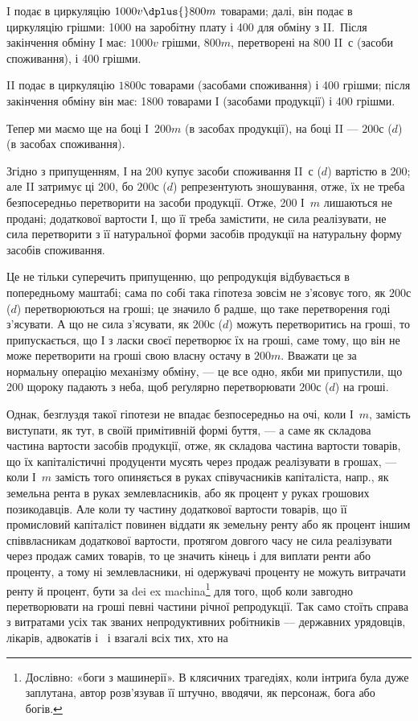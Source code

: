 
I подає в циркуляцію $1000 v \dplus{} 800 m$ товарами; далі, він подає
в циркуляцію грішми: 1000 на заробітну плату і 400
для обміну з II.~Після закінчення обміну І має: $1000 v$ грішми, $800 m$,
перетворені на 800 II~$с$ (засоби споживання), і 400 грішми.

II подає в циркуляцію $1800 с$ товарами (засобами споживання) і
400 грішми; після закінчення обміну він має: 1800 товарами І
(засобами продукції) і 400 грішми.

Тепер ми маємо ще на боці І~$200 m$ (в засобах продукції), на боці
II — $200 с$ ($d$) (в засобах споживання).

Згідно з припущенням, І на 200 купує засоби споживання
II~$с$ ($d$) вартістю в 200; але II затримує ці 200, бо $200 с$ ($d$)
репрезентують зношування, отже, їх не треба безпосередньо перетворити
на засоби продукції. Отже, 200 І~$m$ лишаються не продані;
 додаткової вартости І, що її треба замістити, не сила реалізувати, не
сила перетворити з її натуральної форми засобів продукції на натуральну
форму засобів споживання.

Це не тільки суперечить припущенню, що репродукція відбувається
в попередньому маштабі; сама по собі така гіпотеза зовсім не з’ясовує
того, як $200 с$ ($d$) перетворюються на гроші; це значило б радше, що
таке перетворення годі з’ясувати. А що не сила з’ясувати, як $200 с$ ($d$)
можуть перетворитись на гроші, то припускається, що І з ласки своєї
перетворює їх на гроші, саме тому, що він не може перетворити на гроші
свою власну остачу в $200 m$. Вважати це за нормальну операцію механізму
обміну, — це все одно, якби ми припустили, що 200
щороку падають з неба, щоб реґулярно перетворювати $200 с$ ($d$) на гроші.

Однак, безглуздя такої гіпотези не впадає безпосередньо на очі, коли І~$m$,
замість виступати, як тут, в своїй примітивній формі буття, — а саме як
складова частина вартости засобів продукції, отже, як складова частина
вартости товарів, що їх капіталістичні продуценти мусять через продаж
реалізувати в грошах, — коли І~$m$ замість того опиняється в руках співучасників
капіталіста, напр., як земельна рента в руках землевласників,
або як процент у руках грошових позикодавців. Але коли ту частину додаткової
вартости товарів, що її промисловий капіталіст повинен віддати
як земельну ренту або як процент іншим співвласникам додаткової вартости,
протягом довгого часу не сила реалізувати через продаж самих
товарів, то це значить кінець і для виплати ренти або проценту, а тому
ні землевласники, ні одержувачі проценту не можуть витрачати ренту й
процент, бути за dei ex machina\footnote*{
Дослівно: «боги з машинерії». В клясичних
трагедіях, коли інтриґа була дуже заплутана, автор розв’язував її штучно,
вводячи, як персонаж, бога або богів. 
} для того, щоб коли завгодно перетворювати
на гроші певні частини річної репродукції. Так само стоїть
справа з витратами усіх так званих непродуктивних робітників — державних
урядовців, лікарів, адвокатів і~ і взагалі всіх тих, хто на
\parbreak{}  %
